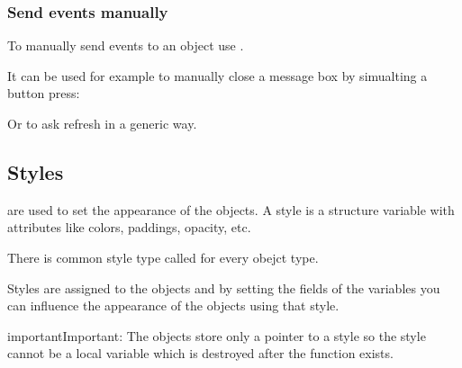 \documentclass[letterpaper,10pt,english]{sphinxmanual}
\begin{document}
\subsubsection{Send events manually}
\label{\detokenize{overview/events:send-events-manually}}
To manually send events to an object use .

It can be used for example to manually close a message box by simualting a button press:

\begin{sphinxVerbatim}[commandchars=\\\{\}]
   
  
\end{sphinxVerbatim}

Or to ask refresh in a generic way.

\begin{sphinxVerbatim}[commandchars=\\\{\}]
  
\end{sphinxVerbatim}


\subsection{Styles}
\label{\detokenize{overview/styles:styles}}\label{\detokenize{overview/styles::doc}}
 are used to set the appearance of the objects. A style is a structure variable with attributes like colors, paddings, opacity, etc.

There is common style type called  for every obejct type.

Styles are assigned to the objects and by setting the fields of the  variables you can influence the appearance of the objects using that style.

\begin{sphinxadmonition}{important}{Important:}
The objects store only a pointer to a style so the style cannot be a local variable which is destroyed after the function exists. 
\end{sphinxadmonition}
\end{document}
